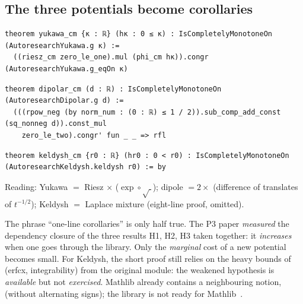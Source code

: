 \subsection{The three potentials become corollaries}
\begin{leanbox}
\begin{lstlisting}[style=chdeux]
theorem yukawa_cm {κ : ℝ} (hκ : 0 ≤ κ) : IsCompletelyMonotoneOn (AutoresearchYukawa.g κ) :=
  ((riesz_cm zero_le_one).mul (phi_cm hκ)).congr (AutoresearchYukawa.g_eqOn κ)
\end{lstlisting}
\begin{lstlisting}[style=chdeux]
theorem dipolar_cm (d : ℝ) : IsCompletelyMonotoneOn (AutoresearchDipolar.g d) :=
  (((rpow_neg (by norm_num : (0 : ℝ) ≤ 1 / 2)).sub_comp_add_const (sq_nonneg d)).const_mul
    zero_le_two).congr' fun _ _ => rfl
\end{lstlisting}
\begin{lstlisting}[style=chdeux]
theorem keldysh_cm {r0 : ℝ} (hr0 : 0 < r0) : IsCompletelyMonotoneOn (AutoresearchKeldysh.keldysh r0) := by
\end{lstlisting}
\end{leanbox}
\noindent Reading: Yukawa $=$ Riesz $\times$ ($\exp\circ\sqrt{\ }$); dipole $=2\times$ (difference of translates of
$t^{-1/2}$); Keldysh $=$ Laplace mixture (eight-line proof, omitted).

\begin{warnbox}
The phrase ``one-line corollaries'' is only half true. The P3 paper \emph{measured} the dependency closure of the three
results H1, H2, H3 taken together: it \emph{increases} when one goes through the library. Only the \emph{marginal} cost
of a new potential becomes small. For Keldysh, the short proof still relies on the heavy bounds of
 (erfcx, integrability) from the original module: the weakened hypothesis is
\emph{available} but not \emph{exercised}. Mathlib already contains a neighbouring notion, 
(without alternating signs); the library is not ready for Mathlib~\cite{p3}.
\end{warnbox}

